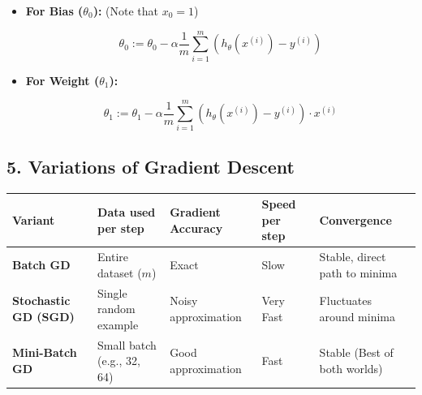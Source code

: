 \documentclass[
  italian,
  11pt,
]{article}
\newcounter{none} %
\begin{document}
\begin{itemize}
\item
  \textbf{For Bias (\(\theta_0\)):} (Note that \(x_0 = 1\))

  \[\theta_0 := \theta_0 - \alpha \frac{1}{m} \sum_{i=1}^{m} (h_\theta(x^{(i)}) - y^{(i)})\]
\item
  \textbf{For Weight (\(\theta_1\)):}

  \[\theta_1 := \theta_1 - \alpha \frac{1}{m} \sum_{i=1}^{m} (h_\theta(x^{(i)}) - y^{(i)}) \cdot x^{(i)}\]
\end{itemize}

\subsection{5. Variations of Gradient
Descent}\label{variations-of-gradient-descent}

{\def\LTcaptype{none} %
\begin{longtable}[]{@{}
  >{\raggedright\arraybackslash}p{}
  >{\raggedright\arraybackslash}p{}
  >{\raggedright\arraybackslash}p{}
  >{\raggedright\arraybackslash}p{}
  >{\raggedright\arraybackslash}p{}@{}}
\toprule\noalign{}
\begin{minipage}[b]{\linewidth}\raggedright
\textbf{Variant}
\end{minipage} & \begin{minipage}[b]{\linewidth}\raggedright
\textbf{Data used per step}
\end{minipage} & \begin{minipage}[b]{\linewidth}\raggedright
\textbf{Gradient Accuracy}
\end{minipage} & \begin{minipage}[b]{\linewidth}\raggedright
\textbf{Speed per step}
\end{minipage} & \begin{minipage}[b]{\linewidth}\raggedright
\textbf{Convergence}
\end{minipage} \\
\midrule\noalign{}
\endhead
\bottomrule\noalign{}
\endlastfoot
\textbf{Batch GD} & Entire dataset (\(m\)) & Exact & Slow & Stable,
direct path to minima \\
\textbf{Stochastic GD (SGD)} & Single random example & Noisy
approximation & Very Fast & Fluctuates around minima \\
\textbf{Mini-Batch GD} & Small batch (e.g., 32, 64) & Good approximation
& Fast & Stable (Best of both worlds) \\
\end{longtable}
}
\end{document}
